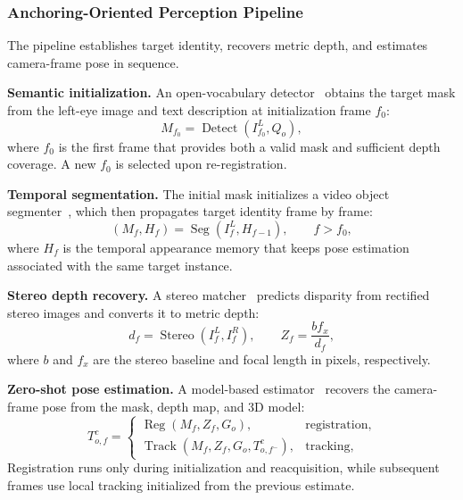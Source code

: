 \documentclass[review]{vgtc}
\begin{document}
\subsubsection{Anchoring-Oriented Perception Pipeline}

The pipeline establishes target identity, recovers metric depth, and estimates camera-frame pose in sequence.

\textbf{Semantic initialization.} An open-vocabulary detector~\cite{yoloe2025} obtains the target mask from the left-eye image and text description at initialization frame $f_0$:
\begin{equation}
M_{f_0} = \operatorname{Detect}(I_{f_0}^{L}, Q_o),
\label{eq:detect}
\end{equation}
where $f_0$ is the first frame that provides both a valid mask and sufficient depth coverage. A new $f_0$ is selected upon re-registration.

\textbf{Temporal segmentation.} The initial mask initializes a video object segmenter~\cite{cutie2024}, which then propagates target identity frame by frame:
\begin{equation}
(M_f, H_f) = \operatorname{Seg}(I_f^{L}, H_{f-1}), \qquad f > f_0,
\label{eq:seg}
\end{equation}
where $H_f$ is the temporal appearance memory that keeps pose estimation associated with the same target instance.

\textbf{Stereo depth recovery.} A stereo matcher~\cite{fastfoundationstereo2026} predicts disparity from rectified stereo images and converts it to metric depth:
\begin{equation}
d_f = \operatorname{Stereo}(I_f^{L}, I_f^{R}), \qquad Z_f = \frac{b f_x}{d_f},
\label{eq:depth}
\end{equation}
where $b$ and $f_x$ are the stereo baseline and focal length in pixels, respectively.

\textbf{Zero-shot pose estimation.} A model-based estimator~\cite{foundationpose2024} recovers the camera-frame pose from the mask, depth map, and 3D model:
\begin{equation}
T_{o,f}^{c} =
\begin{cases}
\operatorname{Reg}(M_f, Z_f, G_o), & \text{registration}, \\
\operatorname{Track}(M_f, Z_f, G_o, T_{o,f^-}^{c}), & \text{tracking},
\end{cases}
\label{eq:pose}
\end{equation}
Registration runs only during initialization and reacquisition, while subsequent frames use local tracking initialized from the previous estimate.
\end{document}
